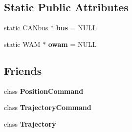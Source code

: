 \subsection*{Static Public Attributes}
\begin{DoxyCompactItemize}
\item 
\hypertarget{classOWD_1_1WamDriver_ade972f01b75c75d37ab363891ae3e261}{static C\-A\-Nbus $\ast$ {\bfseries bus} = N\-U\-L\-L}\label{classOWD_1_1WamDriver_ade972f01b75c75d37ab363891ae3e261}

\item 
\hypertarget{classOWD_1_1WamDriver_a4367ccf5a772c73eb4f29db832d56f65}{static W\-A\-M $\ast$ {\bfseries owam} = N\-U\-L\-L}\label{classOWD_1_1WamDriver_a4367ccf5a772c73eb4f29db832d56f65}

\end{DoxyCompactItemize}
\subsection*{Friends}
\begin{DoxyCompactItemize}
\item 
\hypertarget{classOWD_1_1WamDriver_ac3021095884bb36c725625c73800197f}{class {\bfseries Position\-Command}}\label{classOWD_1_1WamDriver_ac3021095884bb36c725625c73800197f}

\item 
\hypertarget{classOWD_1_1WamDriver_a7be67204b5ea3024401cff4845d96f51}{class {\bfseries Trajectory\-Command}}\label{classOWD_1_1WamDriver_a7be67204b5ea3024401cff4845d96f51}

\item 
\hypertarget{classOWD_1_1WamDriver_ab3a5a13fe0f3e14e0ac76088579a0969}{class {\bfseries Trajectory}}\label{classOWD_1_1WamDriver_ab3a5a13fe0f3e14e0ac76088579a0969}

\end{DoxyCompactItemize}


